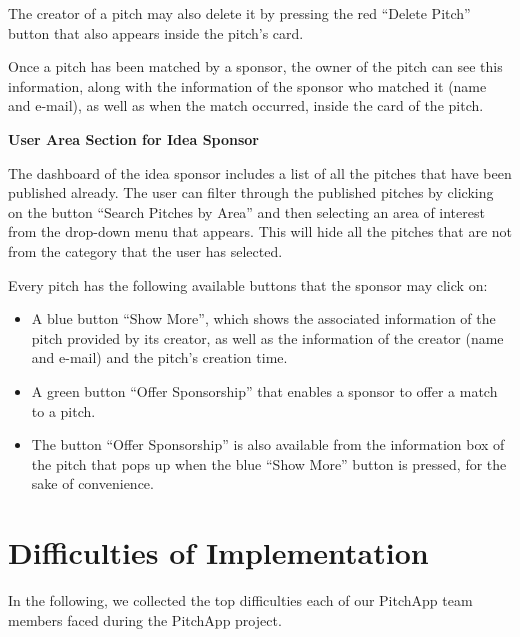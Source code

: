 The creator of a pitch may also delete it by pressing the red “Delete Pitch” button that also appears inside the pitch’s card.

Once a pitch has been matched by a sponsor, the owner of the pitch can see this information, along with the information of the sponsor who matched it (name and e-mail), as well as when the match occurred, inside the card of the pitch.


\textbf{User Area Section for Idea Sponsor}

The dashboard of the idea sponsor includes a list of all the pitches that have been published already.
The user can filter through the published pitches by clicking on the button “Search Pitches by Area” and then selecting an area of interest from the drop-down menu that appears. This will hide all the pitches that are not from the category that the user has selected.

Every pitch has the following available buttons that the sponsor may click on:

\begin{itemize}
\item A blue button “Show More”, which shows the associated information of the pitch provided by its creator, as well as the information of the creator (name and e-mail) and the pitch’s creation time.
\item A green button “Offer Sponsorship” that enables a sponsor to offer a match to a pitch.
\item The button “Offer Sponsorship” is also available from the information box of the pitch that pops up when the blue “Show More” button is pressed, for the sake of convenience.
\end{itemize}

\chapter{Difficulties of Implementation}
In the following, we collected the top difficulties each of our PitchApp team members faced during the PitchApp project.

